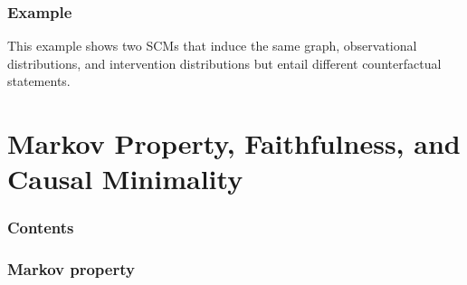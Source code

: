 \documentclass{beamer}
\begin{document}
\begin{frame}
    \frametitle{Example}
    \begin{flushleft}
        This example shows two SCMs that induce the same graph, observational distributions,
        and intervention distributions but entail different counterfactual statements. 
    \end{flushleft} 
\end{frame}

\section{Markov Property, Faithfulness, and Causal Minimality}

\begin{frame}
    \frametitle{Contents}
    \tableofcontents[currentsection]
\end{frame}

\begin{frame}
    \frametitle{Markov property} 
\end{frame}
\end{document}
